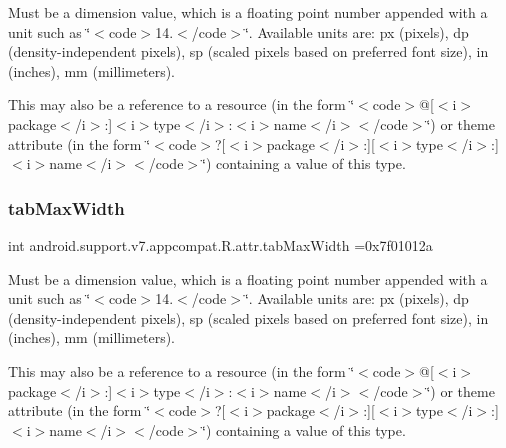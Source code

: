 Must be a dimension value, which is a floating point number appended with a unit such as \char`\"{}$<$code$>$14.\+5sp$<$/code$>$\char`\"{}. Available units are\+: px (pixels), dp (density-\/independent pixels), sp (scaled pixels based on preferred font size), in (inches), mm (millimeters). 

This may also be a reference to a resource (in the form \char`\"{}$<$code$>$@\mbox{[}$<$i$>$package$<$/i$>$\+:\mbox{]}$<$i$>$type$<$/i$>$\+:$<$i$>$name$<$/i$>$$<$/code$>$\char`\"{}) or theme attribute (in the form \char`\"{}$<$code$>$?\mbox{[}$<$i$>$package$<$/i$>$\+:\mbox{]}\mbox{[}$<$i$>$type$<$/i$>$\+:\mbox{]}$<$i$>$name$<$/i$>$$<$/code$>$\char`\"{}) containing a value of this type. \mbox{\label{classandroid_1_1support_1_1v7_1_1appcompat_1_1R_1_1attr_a1202bed5215506aa76adc2844554f4fe}} 
\subsubsection{\texorpdfstring{tab\+Max\+Width}{tabMaxWidth}}
{\footnotesize\ttfamily int android.\+support.\+v7.\+appcompat.\+R.\+attr.\+tab\+Max\+Width =0x7f01012a\hspace{0.3cm}{\ttfamily [static]}}

Must be a dimension value, which is a floating point number appended with a unit such as \char`\"{}$<$code$>$14.\+5sp$<$/code$>$\char`\"{}. Available units are\+: px (pixels), dp (density-\/independent pixels), sp (scaled pixels based on preferred font size), in (inches), mm (millimeters). 

This may also be a reference to a resource (in the form \char`\"{}$<$code$>$@\mbox{[}$<$i$>$package$<$/i$>$\+:\mbox{]}$<$i$>$type$<$/i$>$\+:$<$i$>$name$<$/i$>$$<$/code$>$\char`\"{}) or theme attribute (in the form \char`\"{}$<$code$>$?\mbox{[}$<$i$>$package$<$/i$>$\+:\mbox{]}\mbox{[}$<$i$>$type$<$/i$>$\+:\mbox{]}$<$i$>$name$<$/i$>$$<$/code$>$\char`\"{}) containing a value of this type. \mbox{\label{classandroid_1_1support_1_1v7_1_1appcompat_1_1R_1_1attr_a041fb93bdb43040bd8123acef375698e}} 
